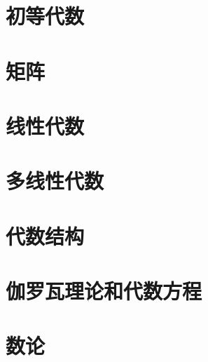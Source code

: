 \chapter{初等代数}







\chapter{矩阵}



\chapter{线性代数}





\chapter{多线性代数}





\chapter{代数结构}



\chapter{伽罗瓦理论和代数方程}






\chapter{数论}














